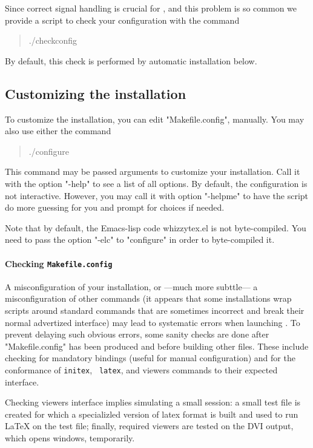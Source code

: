 \documentclass[12pt]{article}
\begin{document}
Since correct signal handling is crucial for {\whizzy}, and this problem
is so common we provide a script to check your configuration with the command
\begin{quote}
\begin{tt}
./checkconfig
\end{tt}
\end{quote}
By default, this check is performed by automatic installation below.

\subsection {Customizing the installation}
\label {customizing}

To customize the installation, you can edit 
\lst"Makefile.config", manually.
You may also use either the command
\begin{quote}
\begin{tt}
./configure
\end{tt}
\end{quote}
This command may be passed arguments to customize your installation.
Call it with the option \lst"-help" to see a list of all options.
%
By default, the configuration is not interactive.  However, you may call it
with option \lst"-helpme" to have the script do more guessing for you and
prompt for choices if needed.

Note that by default, the Emacs-lisp code whizzytex.el is not
byte-compiled. You need to pass the option \lst"-elc" to \lst"configure" in
order to byte-compiled it.

\paragraph {Checking {\tt Makefile.config}}

A misconfiguration of your installation, or ---much more subttle--- a
misconfiguration of other commands (it appears that some installations wrap
scripts around standard commands that are sometimes incorrect and break
their normal advertized interface) may lead to systematic errors when
launching {\whizzy}. To prevent delaying such obvious errors, some sanity
checks are done after \lst"Makefile.config" has been produced and before
building other files.  These include checking for mandatory bindings (useful
for manual configuration) and for the conformance of {\tt initex}, {\tt
latex}, and viewers commands to their expected interface.

Checking viewers interface implies simulating a small {\whizzy} session: a
small test file is created for which a specializled version of latex format
is built and used to run {\LaTeX} on the test file; finally, required
viewers are tested on the DVI output, which opens windows, temporarily.
\end{document}
